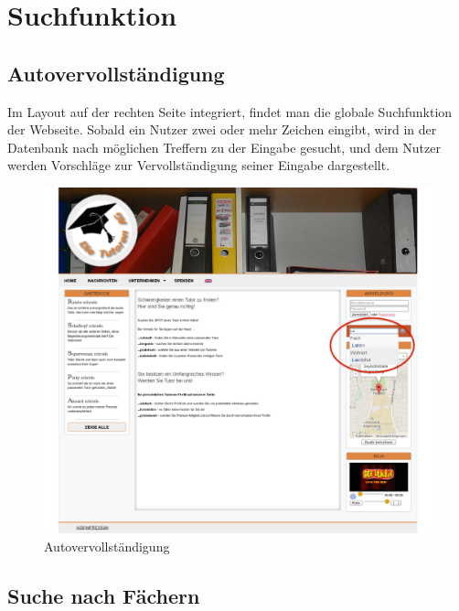 
\section{Suchfunktion}

\subsection{Autovervollständigung}

Im Layout auf der rechten Seite integriert, findet man die globale Suchfunktion der Webseite. 
Sobald ein Nutzer zwei oder mehr Zeichen eingibt, wird in der Datenbank nach 
möglichen Treffern zu der Eingabe gesucht, und dem Nutzer werden Vorschläge zur Vervollständigung seiner Eingabe dargestellt.
\begin{figure}[!htbp]
\centering
\includegraphics[width=1\linewidth]{../Screenshots/de/Autocompletion}
\caption{Autovervollständigung}
\label{fig:Autovervollstaendigung}
\end{figure}

\newpage
\subsection{Suche nach Fächern}


